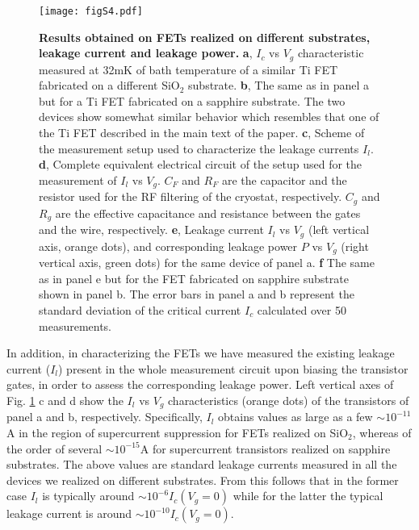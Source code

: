 \documentclass[prl,twocolumn,reprint,graphicx,showpacs,superscriptaddress,floatfix]{revtex4-1}
\begin{document}
\begin{figure}[t!]
\begin{center}
\texttt{[image: figS4.pdf]}\vspace{-3mm}
\caption{\textbf{Results obtained on FETs realized on different substrates, leakage current and leakage power.} 
\textbf{a}, $I_c$ vs $V_g$ characteristic measured at 32mK of bath temperature of a similar Ti FET fabricated on a different SiO$_2$ substrate. 
\textbf{b}, The same as in panel a but for a Ti FET fabricated on a sapphire substrate. The two devices show somewhat similar behavior which resembles that one of the Ti FET described in the main text of the paper. 
\textbf{c}, Scheme of the measurement setup used to characterize the leakage currents $I_l$.
\textbf{d}, Complete equivalent electrical circuit of the setup used for the measurement of $I_l$ vs $V_g$. $C_F$ and $R_F$ are the capacitor and the resistor used for the RF filtering of the cryostat, respectively. $C_g$ and $R_g$ are the effective capacitance and resistance between the gates and the wire, respectively. 
\textbf{e}, Leakage current $I_l$ vs $V_g$ (left vertical axis, orange dots), and corresponding leakage power $P$ vs $V_g$ (right vertical axis, green dots) for the same device of  panel a.
\textbf{f} The same as in panel e but for the FET fabricated on sapphire substrate shown in panel b. The error bars in panel a and b represent
the standard deviation of the critical current $I_c$
calculated over 50 measurements.
}
\label{figS4}
\end{center}
\end{figure}

In addition, in characterizing the FETs we have measured the existing leakage current ($I_l$) present in the whole measurement circuit upon biasing the transistor gates, in order to assess the corresponding leakage power. 
Left vertical axes of Fig. \ref{figS4} c and d show the $I_l$ vs $V_g$ characteristics (orange dots) of the transistors of panel a and b, respectively. 
Specifically, $I_l$ obtains values as large as a few $\sim 10^{-11}$A in the region of supercurrent suppression for FETs realized on SiO$_2$, whereas of the order of several
 $\sim 10^{-15}$A for supercurrent transistors realized on sapphire substrates. 
The above values are standard leakage currents  measured in all the devices we realized on different substrates. 
From this follows that in the former case $I_l$ is typically around $\sim 10^{-6}I_c(V_g=0)$ while for the latter the typical leakage current is around $\sim 10^{-10}I_c(V_g=0)$. 
\end{document}
